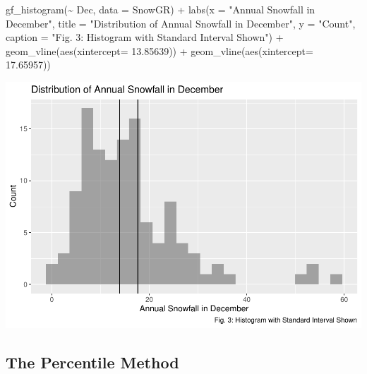 \documentclass[12pt]{article}
\newenvironment{Shaded}{\begin{snugshade}}{\end{snugshade}}
\newcommand{\AttributeTok}[1]{\textcolor[rgb]{0.77,0.63,0.00}{#1}}
\newcommand{\FloatTok}[1]{\textcolor[rgb]{0.00,0.00,0.81}{#1}}
\newcommand{\FunctionTok}[1]{\textcolor[rgb]{0.00,0.00,0.00}{#1}}
\newcommand{\NormalTok}[1]{#1}
\newcommand{\SpecialCharTok}[1]{\textcolor[rgb]{0.00,0.00,0.00}{#1}}
\newcommand{\StringTok}[1]{\textcolor[rgb]{0.31,0.60,0.02}{#1}}
\begin{document}
\begin{Shaded}
\begin{Highlighting}[]
\FunctionTok{gf\_histogram}\NormalTok{(}\SpecialCharTok{\textasciitilde{}}\NormalTok{ Dec, }\AttributeTok{data =}\NormalTok{ SnowGR) }\SpecialCharTok{+}
  \FunctionTok{labs}\NormalTok{(}\AttributeTok{x =} \StringTok{"Annual Snowfall in December"}\NormalTok{, }
       \AttributeTok{title =} \StringTok{"Distribution of Annual Snowfall in December"}\NormalTok{, }\AttributeTok{y =} \StringTok{"Count"}\NormalTok{,}
       \AttributeTok{caption =} \StringTok{"Fig. 3: Histogram with Standard Interval Shown"}\NormalTok{) }\SpecialCharTok{+}
  \FunctionTok{geom\_vline}\NormalTok{(}\FunctionTok{aes}\NormalTok{(}\AttributeTok{xintercept=} \FloatTok{13.85639}\NormalTok{)) }\SpecialCharTok{+}
  \FunctionTok{geom\_vline}\NormalTok{(}\FunctionTok{aes}\NormalTok{(}\AttributeTok{xintercept=} \FloatTok{17.65957}\NormalTok{))}
\end{Highlighting}
\end{Shaded}

\includegraphics{paper_files/figure-latex/unnamed-chunk-3-1.pdf}

\hypertarget{the-percentile-method}{%
\subsection{The Percentile Method}\label{the-percentile-method}}
\end{document}
